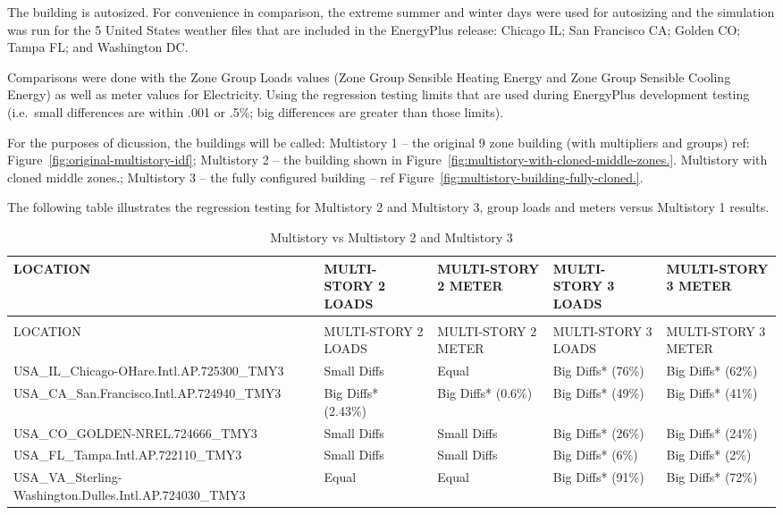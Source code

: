 The building is autosized. For convenience in comparison, the extreme summer and winter days were used for autosizing and the simulation was run for the 5 United States weather files that are included in the EnergyPlus release: Chicago IL; San Francisco CA; Golden CO; Tampa FL; and Washington DC.

Comparisons were done with the Zone Group Loads values (Zone Group Sensible Heating Energy and Zone Group Sensible Cooling Energy) as well as meter values for Electricity. Using the regression testing limits that are used during EnergyPlus development testing (i.e.~small differences are within .001 or .5\%; big differences are greater than those limits).

For the purposes of dicussion, the buildings will be called: Multistory 1 -- the original 9 zone building (with multipliers and groups) ref: Figure~\ref{fig:original-multistory-idf}; Multistory 2 -- the building shown in Figure~\ref{fig:multistory-with-cloned-middle-zones.}. Multistory with cloned middle zones.; Multistory 3 -- the fully configured building -- ref Figure~\ref{fig:multistory-building-fully-cloned.}.

The following table illustrates the regression testing for Multistory 2 and Multistory 3, group loads and meters versus Multistory 1 results.

\begin{longtable}[c]{p{1.2in}p{1.2in}p{1.2in}p{1.2in}p{1.2in}}
\caption{Multistory vs Multistory 2 and Multistory 3 \label{table:multistory-vs-multistory-2-and-multistory-3}} \tabularnewline
\toprule 
LOCATION & MULTI-STORY 2 LOADS & MULTI-STORY 2 METER & MULTI-STORY 3 LOADS & MULTI-STORY 3 METER \tabularnewline
\midrule
\endfirsthead

\caption[]{Multistory vs Multistory 2 and Multistory 3} \tabularnewline
\toprule 
LOCATION & MULTI-STORY 2 LOADS & MULTI-STORY 2 METER & MULTI-STORY 3 LOADS & MULTI-STORY 3 METER \tabularnewline
\midrule
\endhead

USA\_IL\_Chicago-OHare.Intl.AP.725300\_TMY3 & Small Diffs & Equal & Big Diffs* (76\%) & Big Diffs* (62\%) \tabularnewline
USA\_CA\_San.Francisco.Intl.AP.724940\_TMY3 & Big Diffs* (2.43\%) & Big Diffs* (0.6\%) & Big Diffs* (49\%) & Big Diffs* (41\%) \tabularnewline
USA\_CO\_GOLDEN-NREL.724666\_TMY3 & Small Diffs & Small Diffs & Big Diffs* (26\%) & Big Diffs* (24\%) \tabularnewline
USA\_FL\_Tampa.Intl.AP.722110\_TMY3 & Small Diffs & Small Diffs & Big Diffs* (6\%) & Big Diffs* (2\%) \tabularnewline
USA\_VA\_Sterling-Washington.Dulles.Intl.AP.724030\_TMY3 & Equal & Equal & Big Diffs* (91\%) & Big Diffs* (72\%) \tabularnewline
\bottomrule
\end{longtable}

